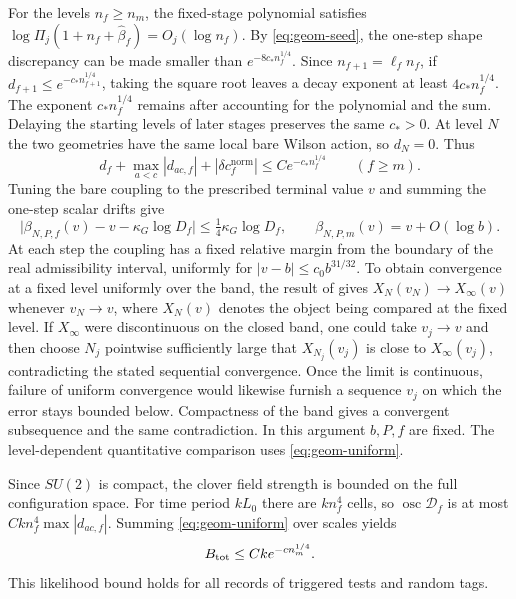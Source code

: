 \documentclass[11pt,a4paper]{article}
\numberwithin{equation}{section}
\begin{document}
For the levels \(n_f\ge n_m\), the fixed-stage polynomial satisfies \(\log\Pi_j(1+n_f+\widehat\beta_f)=O_j(\log n_f)\). By \eqref{eq:geom-seed}, the one-step shape discrepancy can be made smaller than \(e^{-8c_*n_f^{1/4}}\). Since \(n_{f+1}=\ell_f n_f\), if \(d_{f+1}\le e^{-c_*n_{f+1}^{1/4}}\), taking the square root leaves a decay exponent at least \(4c_*n_f^{1/4}\). The exponent \(c_*n_f^{1/4}\) remains after accounting for the polynomial and the sum. Delaying the starting levels of later stages preserves the same \(c_*>0\). At level \(N\) the two geometries have the same local bare Wilson action, so \(d_N=0\). Thus
\begin{equation}
 d_f+\max_{a<c}|d_{ac,f}|+|\delta c_f^{\mathrm{norm}}|
       \le C e^{-c_*n_f^{1/4}}\qquad(f\ge m).
 \label{eq:geom-uniform}
\end{equation}
Tuning the bare coupling to the prescribed terminal value \(v\) and summing the one-step scalar drifts give
\[
 \big|\beta_{N,P,f}(v)-v-\kappa_G\log D_f\big|
       \le\tfrac14\kappa_G\log D_f,\qquad
 \beta_{N,P,m}(v)=v+O(\log b).
\]
At each step the coupling has a fixed relative margin from the boundary of the real admissibility interval, uniformly for \(|v-b|\le c_0 b^{31/32}\). To obtain convergence at a fixed level uniformly over the band, the result of \cite[Lemma 13.24]{armstrong} gives \(X_N(v_N)\to X_\infty(v)\) whenever \(v_N\to v\), where \(X_N(v)\) denotes the object being compared at the fixed level. If \(X_\infty\) were discontinuous on the closed band, one could take \(v_j\to v\) and then choose \(N_j\) pointwise sufficiently large that \(X_{N_j}(v_j)\) is close to \(X_\infty(v_j)\), contradicting the stated sequential convergence. Once the limit is continuous, failure of uniform convergence would likewise furnish a sequence \(v_j\) on which the error stays bounded below. Compactness of the band gives a convergent subsequence and the same contradiction. In this argument \(b,P,f\) are fixed. The level-dependent quantitative comparison uses \eqref{eq:geom-uniform}.

Since \(SU(2)\) is compact, the clover field strength is bounded on the full configuration space. For time period \(kL_0\) there are \(kn_f^4\) cells, so \(\operatorname{osc}\mathcal D_f\) is at most \(Ckn_f^4\max|d_{ac,f}|\). Summing \eqref{eq:geom-uniform} over scales yields
\begin{equation}
 B_{\rm tot}\le Ck e^{-c n_m^{1/4}} .
 \label{eq:geom-total-reset}
\end{equation}
This likelihood bound holds for all records of triggered tests and random tags.
\end{document}
